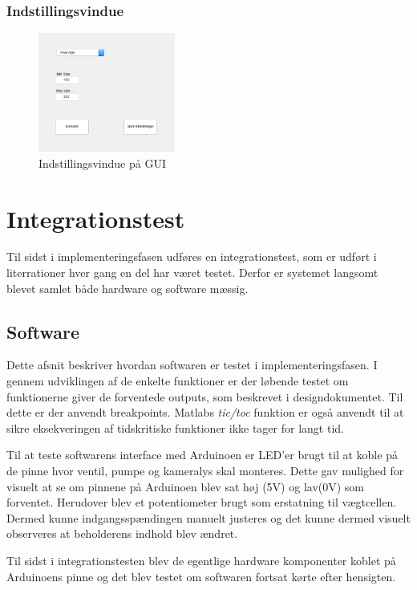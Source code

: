 \subsubsection{Indstillingsvindue}
\begin{figure}[H]
	\centering
	\includegraphics[width=0.4\textwidth]{billeder/software/settings.png}
	\caption{Indstillingsvindue på GUI}
	\label{fig:finishedSettings}
\end{figure}


\newpage
\section{Integrationstest}
Til sidst i implementeringsfasen udføres en integrationstest, som er udført i literrationer hver gang en del har været testet. Derfor er systemet langsomt blevet samlet både hardware og software mæssig.

\subsection{Software}
Dette afsnit beskriver hvordan softwaren er testet i implementeringsfasen. I gennem udviklingen af de enkelte funktioner er der løbende testet om funktionerne giver de forventede outputs, som beskrevet i designdokumentet. Til dette er der anvendt breakpoints. Matlabs \textit{tic/toc} funktion er også anvendt til at sikre eksekveringen af tidskritiske funktioner ikke tager for langt tid. 

Til at teste softwarens interface med Arduinoen er LED'er brugt til at koble på de pinne hvor ventil, pumpe og kameralys skal monteres. Dette gav mulighed for visuelt at se om pinnene på Arduinoen blev sat høj (5V) og lav(0V) som forventet. Herudover blev et potentiometer brugt som erstatning til vægtcellen. Dermed kunne indgangsspændingen manuelt justeres og det kunne dermed visuelt observeres at beholderens indhold blev ændret.

Til sidst i integrationstesten blev de egentlige hardware komponenter koblet på Arduinoens pinne og det blev testet om softwaren fortsat kørte efter hensigten.
